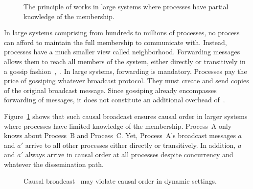 \begin{figure}
  \begin{center}
    
    \caption{\label{fig:disseminationtree}The principle of
      \cite{friedman2004causal} works in large systems where processes have
      partial knowledge of the membership.}
  \end{center}
\end{figure}



In large systems comprising from hundreds to millions of processes, no process
can afford to maintain the full membership to communicate with. Instead,
processes have a much smaller view called neighborhood. Forwarding messages
allows them to reach all members of the system, either directly or transitively
in a gossip fashion~\cite{demers1987epidemic},~\cite{birman1999bimodal}. In
large systems, forwarding is mandatory.  Processes pay the price of gossiping
whatever broadcast protocol. They must create and send copies of the original
broadcast message. Since gossiping already encompasses forwarding of messages,
it does not constitute an additional overhead of~\cite{friedman2004causal}.

Figure~\ref{fig:disseminationtree} shows that such causal broadcast ensures
causal order in larger systems where processes have limited knowledge of the
membership.  Process~A only knows about Process~B and Process~C.  Yet,
Process~A's broadcast messages $a$ and $a'$ arrive to all other processes either
directly or transitively. In addition, $a$ and $a'$ always arrive in causal
order at all processes despite concurrency and whatever the dissemination path.

\begin{figure*}
  \begin{center}
    \hspace{20pt}
    \hspace{20pt}
    \hspace{20pt}
    \hspace{20pt}
    \caption{\label{fig:preventiveproblem}Causal
      broadcast~\cite{friedman2004causal} may violate causal order in dynamic
      settings.}
  \end{center}
\end{figure*}


